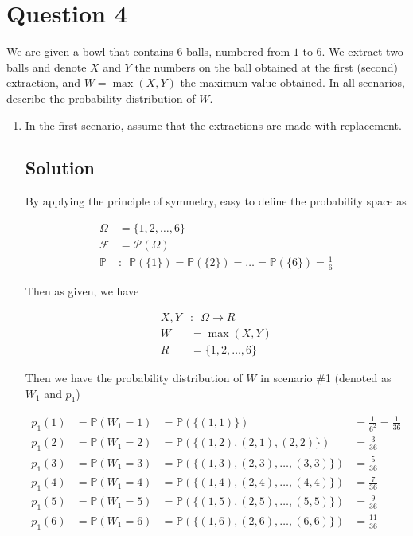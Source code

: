 \documentclass[12pt]{article}
\newcommand{\bP}{\mathbb{P}}
\begin{document}
	
	\section*{Question 4}
	
	\noindent We are given a bowl that contains $6$ balls, numbered from $1$ to $6$. We extract two balls and denote $X$ and $Y$ the numbers on the ball obtained at the first (second) extraction, and $W = \max(X,Y)$ the maximum value obtained. In all scenarios, describe the probability distribution of $W$.
	
	\bigskip
	
	\begin{enumerate}[start=1,label={\bfseries Part \arabic*:},leftmargin=0in]
		\bigskip\item In the first scenario, assume that the extractions are made with replacement.
		
		\subsection*{Solution}
		
			By applying the principle of symmetry, easy to define the probability space as
			
			\[
			\begin{aligned}
				\Omega &= \{1,2,\dots,6\}\\
				\mathcal{F} &= \mathcal{P}(\Omega)\\
				\bP &:\enspace \bP(\{1\}) = \bP(\{2\}) = \dots = \bP(\{6\}) = \frac{1}{6}
			\end{aligned}
			\]
			
			Then as given, we have
			
			\[
			\begin{aligned}
				X,Y &:\enspace \Omega \rightarrow R\\
				W &= \max(X,Y)\\
				R &= \{1,2,\dots,6\}
			\end{aligned}
			\]
			
			Then we have the probability distribution of $W$ in scenario \#1 (denoted as $W_1$ and $p_1$)
			
			\[
			\begin{aligned}
				p_1(1) &= \bP(W_1 = 1) &= \bP(\{(1,1)\}) &= \frac{1}{6^2} = \frac{1}{36}\\
				p_1(2) &= \bP(W_1 = 2) &= \bP(\{(1,2),(2,1),(2,2)\}) &= \frac{3}{36}\\
				p_1(3) &= \bP(W_1 = 3) &= \bP(\{(1,3),(2,3),\dots,(3,3)\}) &= \frac{5}{36}\\
				p_1(4) &= \bP(W_1 = 4) &= \bP(\{(1,4),(2,4),\dots,(4,4)\}) &= \frac{7}{36}\\
				p_1(5) &= \bP(W_1 = 5) &= \bP(\{(1,5),(2,5),\dots,(5,5)\}) &= \frac{9}{36}\\
				p_1(6) &= \bP(W_1 = 6) &= \bP(\{(1,6),(2,6),\dots,(6,6)\}) &= \frac{11}{36}
			\end{aligned}
			\]
			

\end{enumerate}
\end{document}
